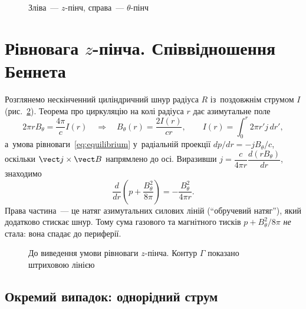 \begin{figure}[ht]\centering
	\caption{Зліва~--- $z$-пінч, справа~--- $\theta$-пінч}
	\label{pic:pinch-types}
\end{figure}

\section{Рівновага \texorpdfstring{$z$}{z}-пінча. Співвідношення Беннета}

Розглянемо нескінченний циліндричний шнур радіуса $R$ із~поздовжнім струмом $I$
(рис.~\ref{pic:z-pinch-equilibrium}). Теорема про циркуляцію на колі радіуса $r$ дає
азимутальне поле
\begin{equation*}
	2\pi rB_\theta=\frac{4\pi}cI(r)\quad\Rightarrow\quad B_\theta(r)=\frac{2I(r)}{cr},\qquad I(r)=\int_0^r2\pi r'j\,dr',
\end{equation*}
а~умова рівноваги~\eqref{eq:equilibrium} у~радіальній проекції $dp/dr=-jB_\theta/c$,
оскільки $\vect j\times\vect B$ напрямлено до осі. Виразивши $j=\dfrac c{4\pi
r}\dfrac{d(rB_\theta)}{dr}$, знаходимо
\begin{equation}\label{eq:z-pinch-general}
	\frac{d}{dr}\left(p+\frac{B_\theta^2}{8\pi}\right)=-\frac{B_\theta^2}{4\pi r}.
\end{equation}
Права частина~--- це натяг азимутальних силових ліній (\enquote{обручевий натяг}), який
додатково стискає шнур. Тому сума газового та магнітного тисків $p+B_\theta^2/8\pi$
\emph{не} стала: вона спадає до периферії.

\begin{figure}[ht]\centering
	\caption{До виведення умови рівноваги $z$-пінча. Контур $\Gamma$ показано штриховою
	лінією}
	\label{pic:z-pinch-equilibrium}
\end{figure}

\subsection*{Окремий випадок: однорідний струм}

